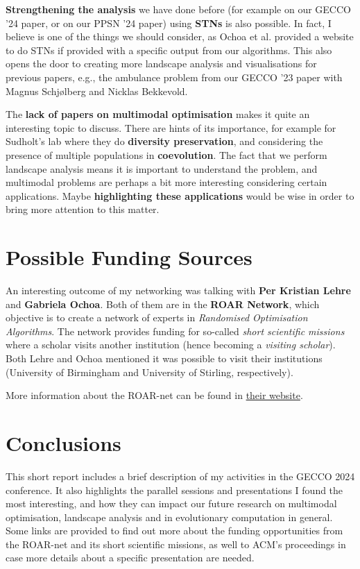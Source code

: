 \documentclass[11pt, letterpaper, oneside]{article}
\begin{document}
\textbf{Strengthening the analysis} we have done before (for example on our GECCO '24 paper, or on our PPSN '24 paper) using \textbf{STNs} is also possible.
In fact, I believe is one of the things we should consider, as Ochoa et al. provided a website to do STNs if provided with a specific output from our algorithms.
This also opens the door to creating more landscape analysis and visualisations for previous papers, e.g., the ambulance problem from our GECCO '23 paper with Magnus Schjølberg and Nicklas Bekkevold.

The \textbf{lack of papers on multimodal optimisation} makes it quite an interesting topic to discuss.
There are hints of its importance, for example for Sudholt's lab where they do \textbf{diversity preservation}, and considering the presence of multiple populations in \textbf{coevolution}.
The fact that we perform landscape analysis means it is important to understand the problem, and multimodal problems are perhaps a bit more interesting considering certain applications.
Maybe \textbf{highlighting these applications} would be wise in order to bring more attention to this matter.

\section{Possible Funding Sources}

An interesting outcome of my networking was talking with \textbf{Per Kristian Lehre} and \textbf{Gabriela Ochoa}.
Both of them are in the \textbf{ROAR Network}, which objective is to create a network of experts in \textit{Randomised Optimisation Algorithms}.
The network provides funding for so-called \textit{short scientific missions} where a scholar visits another institution (hence becoming a \textit{visiting scholar}).
Both Lehre and Ochoa mentioned it was possible to visit their institutions (University of Birmingham and University of Stirling, respectively).

More information about the ROAR-net can be found in \href{https://roar-net.eu/}{their website}.

\section{Conclusions}
\label{sec:conc}

This short report includes a brief description of my activities in the GECCO 2024 conference.
It also highlights the parallel sessions and presentations I found the most interesting, and how they can impact our future research on multimodal optimisation, landscape analysis and in evolutionary computation in general.
Some links are provided to find out more about the funding opportunities from the ROAR-net and its short scientific missions, as well to ACM's proceedings in case more details about a specific presentation are needed.
\end{document}
